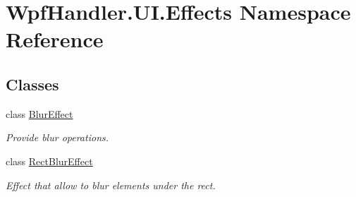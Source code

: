 \hypertarget{namespace_wpf_handler_1_1_u_i_1_1_effects}{}\section{Wpf\+Handler.\+U\+I.\+Effects Namespace Reference}
\label{namespace_wpf_handler_1_1_u_i_1_1_effects}
\subsection*{Classes}
\begin{DoxyCompactItemize}
\item 
class \mbox{\hyperlink{class_wpf_handler_1_1_u_i_1_1_effects_1_1_blur_effect}{Blur\+Effect}}
\begin{DoxyCompactList}\small\item\em Provide blur operations. \end{DoxyCompactList}\item 
class \mbox{\hyperlink{class_wpf_handler_1_1_u_i_1_1_effects_1_1_rect_blur_effect}{Rect\+Blur\+Effect}}
\begin{DoxyCompactList}\small\item\em Effect that allow to blur elements under the rect. \end{DoxyCompactList}\end{DoxyCompactItemize}

